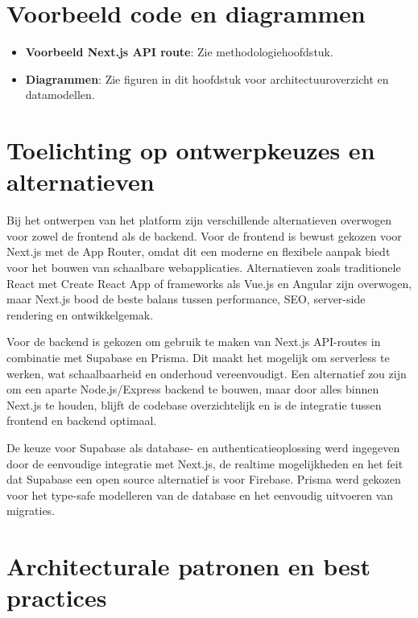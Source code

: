\section{Voorbeeld code en diagrammen}
\label{sec:code-diagrammen}

\begin{itemize}
    \item \textbf{Voorbeeld Next.js API route}: Zie methodologiehoofdstuk.
    \item \textbf{Diagrammen}: Zie figuren in dit hoofdstuk voor architectuuroverzicht en datamodellen.
\end{itemize}

\section{Toelichting op ontwerpkeuzes en alternatieven}
\label{sec:ontwerpkeuzes}

Bij het ontwerpen van het platform zijn verschillende alternatieven overwogen voor zowel de frontend als de backend. Voor de frontend is bewust gekozen voor Next.js met de App Router, omdat dit een moderne en flexibele aanpak biedt voor het bouwen van schaalbare webapplicaties. Alternatieven zoals traditionele React met Create React App of frameworks als Vue.js en Angular zijn overwogen, maar Next.js bood de beste balans tussen performance, SEO, server-side rendering en ontwikkelgemak.

Voor de backend is gekozen om gebruik te maken van Next.js API-routes in combinatie met Supabase en Prisma. Dit maakt het mogelijk om serverless te werken, wat schaalbaarheid en onderhoud vereenvoudigt. Een alternatief zou zijn om een aparte Node.js/Express backend te bouwen, maar door alles binnen Next.js te houden, blijft de codebase overzichtelijk en is de integratie tussen frontend en backend optimaal.

De keuze voor Supabase als database- en authenticatieoplossing werd ingegeven door de eenvoudige integratie met Next.js, de realtime mogelijkheden en het feit dat Supabase een open source alternatief is voor Firebase. Prisma werd gekozen voor het type-safe modelleren van de database en het eenvoudig uitvoeren van migraties.

\section{Architecturale patronen en best practices}
\label{sec:architecturale-patronen}

